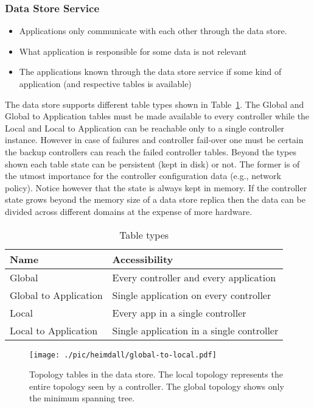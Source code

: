 \documentclass[12pt,openright,twoside]{report}
\begin{document}
\subsubsection{Data Store Service}

\begin{itemize}
\item Applications only communicate with each other through the data store. 
\item What application is responsible for some data is not relevant
\item The applications known through the data store service if some kind of application (and respective tables is available) 
\end{itemize}


The data store supports different table types shown in Table~\ref{tab:table-types}. The Global and Global to Application tables must be made available to every controller while the Local and Local to Application can be reachable only to a single controller instance. However in case of failures and controller fail-over one must be certain the backup controllers can reach the failed controller tables. Beyond the types shown each table state can be persistent (kept in disk) or not. The former is of the utmost importance for the controller configuration data (e.g., network policy). Notice however that the state is always kept in memory. If the controller state grows beyond the memory size  of a data store replica then the data can be divided across different domains at the expense of more hardware. 

\begin{table}[ht]
  \centering
  \begin{tabular}{ll}
    Name & Accessibility \\ \toprule 
    Global & Every controller and every application   \\ 
    Global to Application & Single application on every controller \\
    Local & Every app in a single controller \\
    Local to Application &  Single application in a single controller \\ \bottomrule 
  \end{tabular}
  \caption{Table types}
  \label{tab:table-types}
\end{table}


\begin{figure}[ht]
  \centering
  \texttt{[image: ./pic/heimdall/global-to-local.pdf]}  
  \caption{Topology tables in the data store. The local topology represents the entire topology seen by a controller. The global topology shows only the minimum spanning tree.}
  \label{fig:topologies}
\end{figure}
\end{document}
